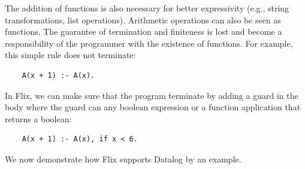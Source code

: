 \documentclass[11pt]{report}
\theoremstyle{definition}
\begin{document}
The addition of functions is also necessary for better expressivity (e.g., string transformations, list operations). Arithmetic operations can also be seen as functions. The guarantee of termination and finiteness is lost and become a responsibility of the programmer with the existence of functions. For example, this simple rule does not terminate:
\begin{verbatim}
    A(x + 1) :- A(x).
\end{verbatim}

In Flix, we can make sure that the program terminate by adding a guard in the body where the guard can any boolean expression or a function application that returns a boolean:
\begin{verbatim}
    A(x + 1) :- A(x), if x < 6.
\end{verbatim}

We now demonstrate how Flix supports Datalog by an example.
\end{document}
